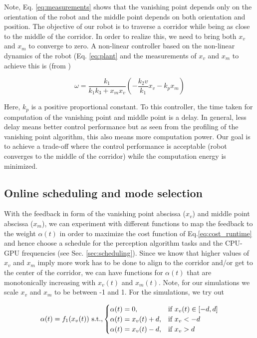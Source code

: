Note, Eq. \ref{eq:measurements} shows that the vanishing point depends only on the orientation of the robot and the middle point depends on both orientation and position. The objective of our robot is to traverse a corridor while being as close to the middle of the corridor. In order to realize this, we need to bring both $x_v$ and $x_m$ to converge to zero. A non-linear controller based on the non-linear dynamics of the robot (Eq. \ref{eq:plant} and the measurements of $x_v$ and $x_m$ to achieve this is (from \cite{VP2})

\begin{equation}
\omega = \frac{k_1}{k_1k_3+x_mx_v}(-\frac{k_2v}{k_1}x_v -k_px_m)
\label{eq:controller}
\end{equation}

Here, $k_p$ is a positive proportional constant. To this controller, the time taken for computation of the vanishing point and middle point is a delay. In general, less delay means better control performance but as seen from the profiling of the vanishing point algorithm, this also means more computation power. Our goal is to achieve a trade-off where the control performance is acceptable (robot converges to the middle of the corridor) while the computation energy is minimized. 

\subsection{Online scheduling and mode selection}

With the feedback in form of the vanishing point abscissa ($x_v$) and middle point abscissa ($x_m$), we can experiment with different functions to map the feedback to the weight $\alpha(t)$ in order to maximize the cost function of Eq.\ref{eq:cost_runtime} and hence choose a schedule for the perception algorithm tasks and the CPU-GPU frequencies (see Sec. \ref{sec:scheduling}). 
Since we know that higher values of $x_v$ and $x_m$ imply more work has to be done to align to the corridor and/or get to the center of the corridor, we can have functions for $\alpha(t)$ that are monotonically increasing with $x_v(t)$ and $x_m(t)$. Note, for our simulations we scale $x_v$ and $x_m$ to be between -1 and 1. For the simulations, we try out

\begin{equation}
\alpha(t) = f_1(x_v(t)) \text{ s.t.,} \\
\begin{cases}
\alpha(t) = 0,&\text{if }x_v(t)\in[-d,d]\\
\alpha(t) = x_v(t)+d,&\text{if }x_v<-d\\
\alpha(t) = x_v(t)-d,&\text{if }x_v>d
\end{cases}
\label{eq:f1}
\end{equation}

